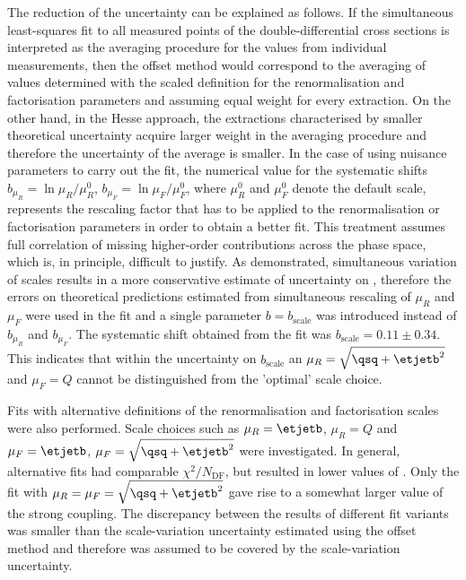 The reduction of the \asz uncertainty can be explained as follows. If the simultaneous least-squares fit to all measured points of the double-differential cross sections is interpreted as the averaging procedure for the \asz values from individual measurements, then the offset method would correspond to the averaging of \asz values determined with the scaled definition for the renormalisation and factorisation parameters and assuming equal weight for every extraction. On the other hand, in the Hesse approach, the extractions characterised by smaller theoretical uncertainty acquire larger weight in the averaging procedure and therefore the uncertainty of the average \asz is smaller. In the case of using nuisance parameters to carry out the fit, the numerical value for the systematic shifts $b_{\mu_R}=\ln{\mu_R/\mu_R^0}$, $b_{\mu_F}=\ln{\mu_F/\mu_F^0}$, where $\mu_R^0$ and $\mu_F^0$ denote the default scale, represents the rescaling factor that has to be applied to the renormalisation or factorisation parameters in order to obtain a better fit. This treatment assumes full correlation of missing higher-order contributions across the phase space, which is, in principle, difficult to justify. As demonstrated, simultaneous variation of scales results in a more conservative estimate of uncertainty on \as, therefore the errors on theoretical predictions estimated from simultaneous rescaling of $\mu_R$ and $\mu_F$ were used in the fit and a single parameter $b=b_\text{scale}$ was introduced instead of $b_{\mu_R}$ and $b_{\mu_F}$. The systematic shift obtained from the fit was $b_\text{scale}=0.11\pm 0.34$. This indicates that within the uncertainty on $b_\text{scale}$ an $\mu_R=\sqrt{\qsq+\etjetb^2}$ and $\mu_F=Q$ cannot be distinguished from the 'optimal' scale choice.

Fits with alternative definitions of the renormalisation and factorisation scales were also performed. Scale choices such as $\mu_R=\etjetb$, $\mu_R=Q$ and $\mu_F=\etjetb$, $\mu_F=\sqrt{\qsq+\etjetb^2}$ were investigated. In general, alternative fits had comparable $\chi^2/N_\text{DF}$, but resulted in lower values of \asz. Only the fit with $\mu_R=\mu_F=\sqrt{\qsq+\etjetb^2}$ gave rise to a somewhat larger value of the strong coupling. The discrepancy between the results of different fit variants was smaller than the scale-variation uncertainty estimated using the offset method and therefore was assumed to be covered by the scale-variation uncertainty.

